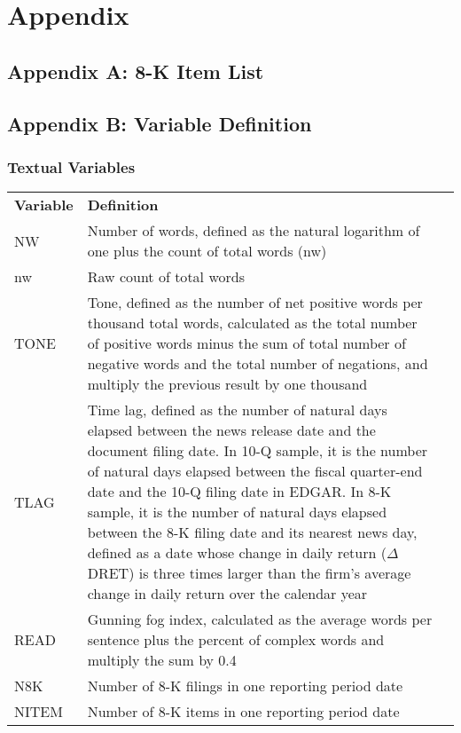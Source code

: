 \section*{Appendix}
\subsection*{Appendix A: 8-K Item List}
\label{appa}


\newpage
\subsection*{Appendix B: Variable Definition}
\label{appb}
\subsubsection*{Textual Variables}
\begin{table}[H]
	\centering
	\begin{tabular}{lp{15cm}p{15cm}}
		\textbf{Variable} & \textbf{Definition} \\
		NW & Number of words, defined as the natural logarithm of one plus the count of total words (nw)\\
		nw & Raw count of total words\\
		TONE & Tone, defined as the number of net positive words per thousand total words, calculated as the total number of positive words minus the sum of total number of negative words and the total number of negations, and multiply the previous result by one thousand\\
		TLAG & Time lag, defined as the number of natural days elapsed between the news release date and the document filing date. In 10-Q sample, it is the number of natural days elapsed between the fiscal quarter-end date and the 10-Q filing date in EDGAR. In 8-K sample, it is the number of natural days elapsed between the 8-K filing date and its nearest news day, defined as a date whose change in daily return ($\Delta$DRET) is three times larger than the firm’s average change in daily return over the calendar year\\
		READ & Gunning fog index, calculated as the average words per sentence plus the percent of complex words and multiply the sum by 0.4 \\
		N8K & Number of 8-K filings in one reporting period date \\
		NITEM & Number of 8-K items in one reporting period date \\
		
	\end{tabular}%
\end{table}%

